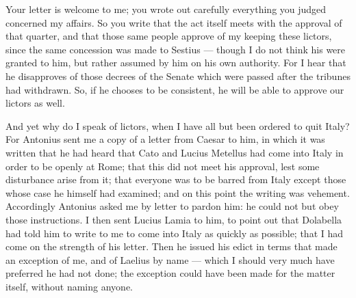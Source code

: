 

 Your letter is welcome to me; you wrote out carefully everything you judged concerned my affairs. So you write that the act itself meets with the approval of that quarter, and that those same people approve of my keeping these lictors, since the same concession was made to Sestius --- though I do not think his were granted to him, but rather assumed by him on his own authority. For I hear that he disapproves of those decrees of the Senate which were passed after the tribunes had withdrawn. So, if he chooses to be consistent, he will be able to approve our lictors as well.

 And yet why do I speak of lictors, when I have all but been ordered to quit Italy? For Antonius sent me a copy of a letter from Caesar to him, in which it was written that he had heard that Cato and Lucius Metellus had come into Italy in order to be openly at Rome; that this did not meet his approval, lest some disturbance arise from it; that everyone was to be barred from Italy except those whose case he himself had examined; and on this point the writing was vehement. Accordingly Antonius asked me by letter to pardon him: he could not but obey those instructions. I then sent Lucius Lamia to him, to point out that Dolabella had told him to write to me to come into Italy as quickly as possible; that I had come on the strength of his letter. Then he issued his edict in terms that made an exception of me, and of Laelius by name --- which I should very much have preferred he had not done; the exception could have been made for the matter itself, without naming anyone.

